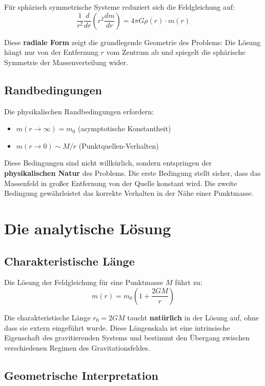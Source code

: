 \documentclass[12pt,a4paper]{report}
\begin{document}
Für sphärisch symmetrische Systeme reduziert sich die Feldgleichung auf:
\begin{equation}
	\frac{1}{r^2} \frac{d}{dr}\left(r^2 \frac{dm}{dr}\right) = 4\pi G \rho(r) \cdot m(r)
\end{equation}

Diese \textbf{radiale Form} zeigt die grundlegende Geometrie des Problems: Die Lösung hängt nur von der Entfernung $r$ vom Zentrum ab und spiegelt die sphärische Symmetrie der Massenverteilung wider.

\subsection{Randbedingungen}

Die physikalischen Randbedingungen erfordern:
\begin{itemize}
	\item $m(r \to \infty) = m_0$ (asymptotische Konstantheit)
	\item $m(r \to 0) \sim M/r$ (Punktquellen-Verhalten)
\end{itemize}

Diese Bedingungen sind nicht willkürlich, sondern entspringen der \textbf{physikalischen Natur} des Problems. Die erste Bedingung stellt sicher, dass das Massenfeld in großer Entfernung von der Quelle konstant wird. Die zweite Bedingung gewährleistet das korrekte Verhalten in der Nähe einer Punktmasse.

\section{Die analytische Lösung}

\subsection{Charakteristische Länge}

Die Lösung der Feldgleichung für eine Punktmasse $M$ führt zu:
\begin{equation}
	m(r) = m_0\left(1 + \frac{2GM}{r}\right)
\end{equation}

Die charakteristische Länge $r_0 = 2GM$ taucht \textbf{natürlich} in der Lösung auf, ohne dass sie extern eingeführt wurde. Diese Längenskala ist eine intrinsische Eigenschaft des gravitierenden Systems und bestimmt den Übergang zwischen verschiedenen Regimen des Gravitationsfeldes.

\subsection{Geometrische Interpretation}
\end{document}
